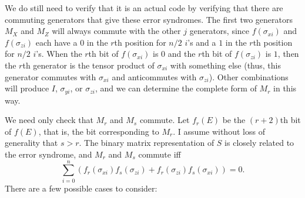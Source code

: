 \documentclass{report}
\newcommand{\Xs}[1]{\sigma_{x{#1}}}
\newcommand{\Ys}[1]{\sigma_{y{#1}}}
\newcommand{\Zs}[1]{\sigma_{z{#1}}}
\newcommand{\Sum}{\sum}
\begin{document}
We do still need to verify that it is an actual code by verifying that 
there are commuting generators that give these error syndromes.  The 
first two generators $M_X$ and $M_Z$ will always commute with the 
other $j$ generators, since $f(\Xs{i})$ and $f(\Zs{i})$ each have a $0$ in the 
$r$th position for $n/2$ $i$'s and a $1$ in the $r$th position for $n/2$ $i$'s.
When the $r$th bit of $f(\Xs{i})$ is $0$  and the $r$th bit of $f(\Zs{i})$ is
$1$, then the $r$th generator is the tensor product of $\Xs{i}$ with something
else (thus, this generator commutes with $\Xs{i}$ and anticommutes with
$\Zs{i}$).  Other combinations will produce $I$, $\Ys{i}$, or $\Zs{i}$, and
we can determine the complete form of $M_r$ in this way.

We need only check that $M_r$ and $M_s$ commute.  Let $f_r (E)$ be the 
$(r+2)$th bit of $f(E)$, that is, the bit corresponding to $M_r$.  I assume 
without loss of generality that $s > r$.  The binary matrix representation of 
$S$ is closely related to the error syndrome, and $M_r$ and $M_s$ 
commute iff
\begin{equation}
\Sum_{i=0}^{n} \left( f_r (\Xs{i}) f_s (\Zs{i}) + f_r (\Zs{i}) f_s (\Xs{i}) 
\right) = 0.
\end{equation}
There are a few possible cases to consider:
\end{document}
